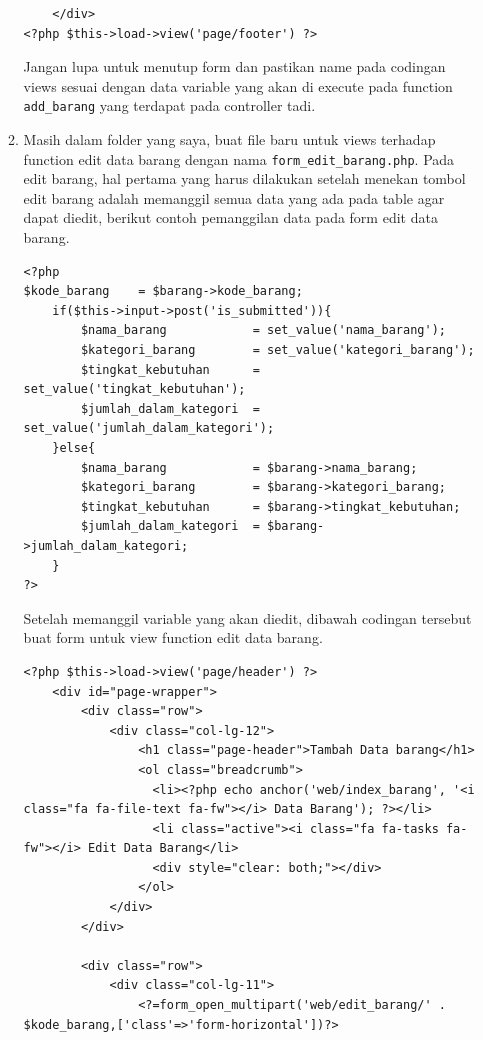 \begin{enumerate}
\begin{enumerate}
\begin{lstlisting}
    </div>
<?php $this->load->view('page/footer') ?>

\end{lstlisting}
    		\par Jangan lupa untuk menutup form dan pastikan name pada codingan views sesuai dengan data variable yang akan di execute pada function \verb|add_barang| yang terdapat pada controller tadi.
    		
    	\item Masih dalam folder yang saya, buat file baru untuk views terhadap function edit data barang dengan nama \verb|form_edit_barang.php|. Pada edit barang, hal pertama yang harus dilakukan setelah menekan tombol edit barang adalah memanggil semua data yang ada pada table agar dapat diedit, berikut contoh pemanggilan data pada form edit data barang.
\begin{lstlisting}
<?php
$kode_barang    = $barang->kode_barang;
    if($this->input->post('is_submitted')){
        $nama_barang            = set_value('nama_barang');
        $kategori_barang        = set_value('kategori_barang');
        $tingkat_kebutuhan      = set_value('tingkat_kebutuhan');
        $jumlah_dalam_kategori  = set_value('jumlah_dalam_kategori');
    }else{
        $nama_barang            = $barang->nama_barang;
        $kategori_barang        = $barang->kategori_barang;
        $tingkat_kebutuhan      = $barang->tingkat_kebutuhan;
        $jumlah_dalam_kategori  = $barang->jumlah_dalam_kategori;
    }
?>
\end{lstlisting}
    		
    		\par Setelah memanggil variable yang akan diedit, dibawah codingan tersebut buat form untuk view function edit data barang.
\begin{lstlisting}
<?php $this->load->view('page/header') ?>
    <div id="page-wrapper">
        <div class="row">
            <div class="col-lg-12">
                <h1 class="page-header">Tambah Data barang</h1>
                <ol class="breadcrumb">
                  <li><?php echo anchor('web/index_barang', '<i class="fa fa-file-text fa-fw"></i> Data Barang'); ?></li>
                  <li class="active"><i class="fa fa-tasks fa-fw"></i> Edit Data Barang</li>
                  <div style="clear: both;"></div>
                </ol>
            </div>
        </div>

        <div class="row">
            <div class="col-lg-11">
                <?=form_open_multipart('web/edit_barang/' . $kode_barang,['class'=>'form-horizontal'])?>


\end{lstlisting}
\end{enumerate}
\end{enumerate}
